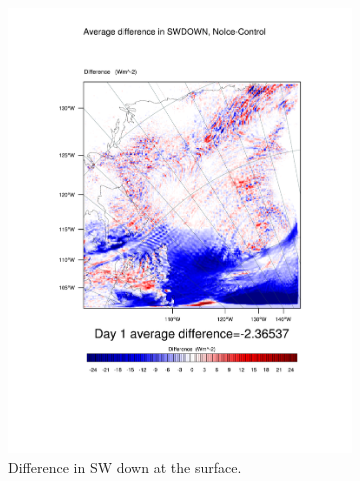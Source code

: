 \begin{figure}
\centering
	\begin{subfigure}{0.48\textwidth}
		\includegraphics[width=\textwidth]{results/noice/diff_NoIce_SWDOWN_Day1.pdf}
		\caption{Difference in SW down at the surface.}
		\label{subfig:swdown_r2Day1}
	\end{subfigure}
	\quad
	\begin{subfigure}{0.48\textwidth}
		\centering

\end{subfigure}
\end{figure}
